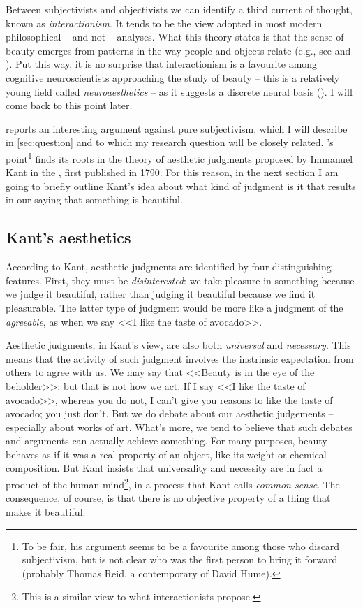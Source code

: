 Between subjectivists and objectivists we can identify a third current of thought, known as \emph{interactionism}. It tends to be the view adopt\-ed in most modern philosophical -- and not -- analyses. What this theory states is that the sense of beauty emerges from patterns in the way people and objects relate (e.g., see \cite{merleau1964primacy} and \cite{ingarden1985selected}). Put this way, it is no surprise that interactionism is a favourite among cognitive neuroscientists approaching the study of beauty -- this is a relatively young field called \emph{neuroaesthetics} -- as it suggests a discrete neural basis (\cite{conway2013neuroaesthetics}). I will come back to this point later.

\cite{graham2005philosophy} reports an interesting argument against pure subjectivism, which I will describe in \autoref{sec:question} and to which my research question will be closely related. \citeauthor{graham2005philosophy}'s point\footnote{To be fair, his argument seems to be a favourite among those who discard subjectivism, but is not clear who was the first person to bring it forward (probably Thomas Reid, a contemporary of David Hume).} finds its roots in the theory of aesthetic judgments proposed by Immanuel Kant in the , first published in 1790. For this reason, in the next section I am going to briefly outline Kant's idea about what kind of judgment is it that results in our saying that something is beautiful.

\subsection{Kant's aesthetics}\label{subsec:kant}
According to Kant, aesthetic judgments are identified by four distinguishing features. First, they must be \emph{disinterested}: we take pleasure in something because we judge it beautiful, rather than judging it beautiful because we find it pleasurable. The latter type of judgment would be more like a judgment of the \emph{agreeable}, as when we say <<I like the taste of avocado>>.

Aesthetic judgments, in Kant's view, are also both \emph{universal} and \emph{necessary}. This means that the activity of such judgment involves the instrinsic expectation from others to agree with us. We may say that <<Beauty is in the eye of the beholder>>: but that is not how we act. If I say <<I like the taste of avocado>>, whereas you do not, I can't give you reasons to like the taste of avocado; you just don't. But we do debate about our aesthetic judgements -- especially about works of art. What's more, we tend to believe that such debates and arguments can actually achieve something. For many purposes, beauty behaves as if it was a real property of an object, like its weight or chemical composition. But Kant insists that universality and necessity are in fact a product of the human mind\footnote{This is a similar view to what interactionists propose.}, in a process that Kant calls \emph{common sense}. The consequence, of course, is that there is no objective property of a thing that makes it beautiful.

